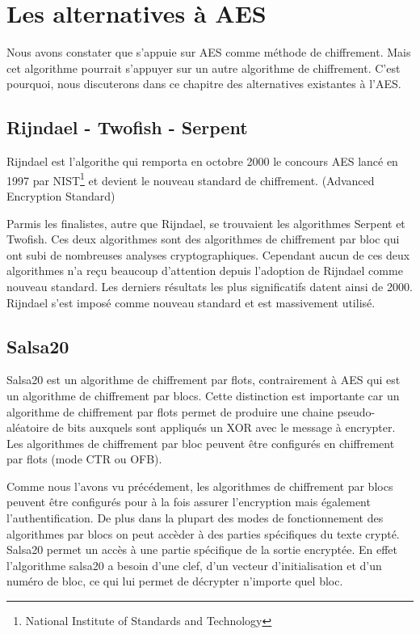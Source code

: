 
\chapter{Les alternatives à AES}

Nous avons constater que \aes s'appuie sur AES comme méthode de chiffrement. Mais cet algorithme pourrait s'appuyer sur un autre algorithme de chiffrement. C'est pourquoi, nous discuterons dans ce chapitre des alternatives existantes à l'AES.

\section{Rijndael - Twofish - Serpent}
Rijndael est l'algorithe qui remporta en octobre 2000 le concours AES lancé en 1997 par NIST\footnote{National Institute of Standards and Technology} et devient le nouveau standard de chiffrement. (Advanced Encryption Standard)

Parmis les finalistes, autre que Rijndael, se trouvaient les algorithmes Serpent et Twofish. Ces deux algorithmes sont des algorithmes de chiffrement par bloc qui ont subi de nombreuses analyses cryptographiques. Cependant aucun de ces deux algorithmes n'a reçu beaucoup d'attention depuis l'adoption de Rijndael comme nouveau standard. Les derniers résultats les plus significatifs datent ainsi de 2000. Rijndael s'est imposé comme nouveau standard et est massivement utilisé.

\section{Salsa20}
Salsa20 est un algorithme de chiffrement par flots, contrairement à AES qui est un algorithme de chiffrement par blocs. Cette distinction est importante car un algorithme de chiffrement par flots permet de produire une chaine pseudo-aléatoire de bits auxquels sont appliqués un XOR avec le message à encrypter. Les algorithmes de chiffrement par bloc peuvent être configurés en chiffrement par flots (mode CTR ou OFB).

Comme nous l'avons vu précédement, les algorithmes de chiffrement par blocs peuvent être configurés pour à la fois assurer l'encryption mais également l'authentification. De plus dans la plupart des modes de fonctionnement des algorithmes par blocs on peut accèder à des parties spécifiques du texte crypté.
Salsa20 permet un accès à une partie spécifique de la sortie encryptée. En effet l'algorithme salsa20 a besoin d'une clef, d'un vecteur d'initialisation et d'un numéro de bloc, ce qui lui permet de décrypter n'importe quel bloc.

